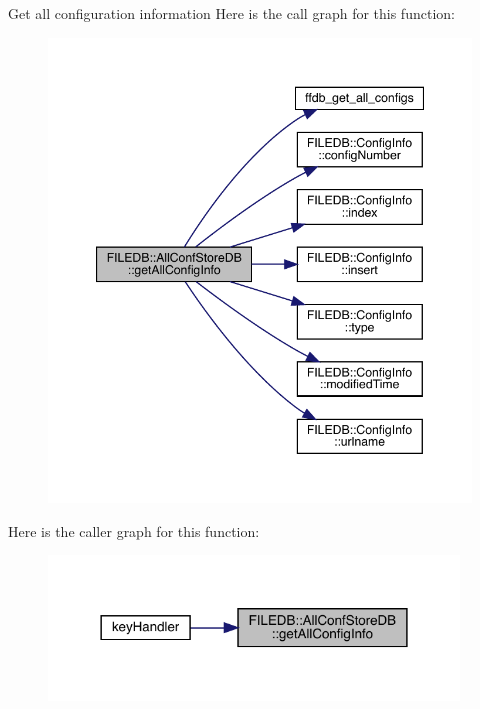 Get all configuration information Here is the call graph for this function\+:
\nopagebreak
\begin{figure}[H]
\begin{center}
\leavevmode
\includegraphics[width=347pt]{df/db6/classFILEDB_1_1AllConfStoreDB_aeb8e6daf1a1f9b7a19899cf7db365632_cgraph}
\end{center}
\end{figure}
Here is the caller graph for this function\+:\nopagebreak
\begin{figure}[H]
\begin{center}
\leavevmode
\includegraphics[width=309pt]{df/db6/classFILEDB_1_1AllConfStoreDB_aeb8e6daf1a1f9b7a19899cf7db365632_icgraph}
\end{center}
\end{figure}
\mbox{\label{classFILEDB_1_1AllConfStoreDB_aa923faf368f0aa7d327c2a3702d261c1}} 
